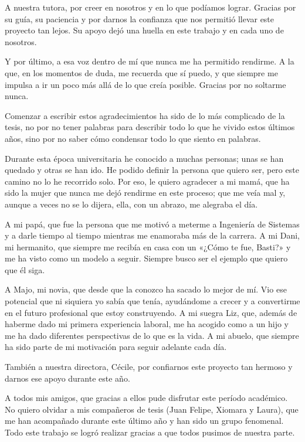 \documentclass[12pt,letterpaper,oneside]{article}
\newcommand{\autorTres}{Sebastián Almanza Galvis}
\begin{document}
A nuestra tutora, por creer en nosotros y en lo que podíamos lograr. Gracias por su guía, su paciencia y por darnos la confianza que nos permitió llevar este proyecto tan lejos. Su apoyo dejó una huella en este trabajo y en cada uno de nosotros.

Y por último, a esa voz dentro de mí que nunca me ha permitido rendirme. A la que, en los momentos de duda, me recuerda que sí puedo, y que siempre me impulsa a ir un poco más allá de lo que creía posible. Gracias por no soltarme nunca.

\vspace{1cm}
\noindent{\bfseries \autorTres:}
\vspace{0.3cm}

Comenzar a escribir estos agradecimientos ha sido de lo más complicado de la tesis, no por no tener palabras para describir todo lo que he vivido estos últimos años, sino por no saber cómo condensar todo lo que siento en palabras.

Durante esta época universitaria he conocido a muchas personas; unas se han quedado y otras se han ido. He podido definir la persona que quiero ser, pero este camino no lo he recorrido solo. Por eso, le quiero agradecer a mi mamá, que ha sido la mujer que nunca me dejó rendirme en este proceso; que me veía mal y, aunque a veces no se lo dijera, ella, con un abrazo, me alegraba el día.

A mi papá, que fue la persona que me motivó a meterme a Ingeniería de Sistemas y a darle tiempo al tiempo mientras me enamoraba más de la carrera. A mi Dani, mi hermanito, que siempre me recibía en casa con un «¿Cómo te fue, Basti?» y me ha visto como un modelo a seguir. Siempre busco ser el ejemplo que quiero que él siga.

A Majo, mi novia, que desde que la conozco ha sacado lo mejor de mí. Vio ese potencial que ni siquiera yo sabía que tenía, ayudándome a crecer y a convertirme en el futuro profesional que estoy construyendo. A mi suegra Liz, que, además de haberme dado mi primera experiencia laboral, me ha acogido como a un hijo y me ha dado diferentes perspectivas de lo que es la vida. A mi abuelo, que siempre ha sido parte de mi motivación para seguir adelante cada día.

También a nuestra directora, Cécile, por confiarnos este proyecto tan hermoso y darnos ese apoyo durante este año.

A todos mis amigos, que gracias a ellos pude disfrutar este período académico. No quiero olvidar a mis compañeros de tesis (Juan Felipe, Xiomara y Laura), que me han acompañado durante este último año y han sido un grupo fenomenal. Todo este trabajo se logró realizar gracias a que todos pusimos de nuestra parte.
\end{document}
